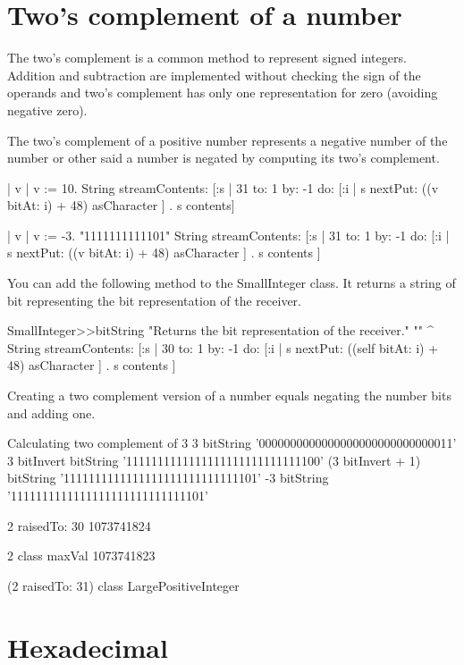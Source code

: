 \documentclass[a4paper,10pt,twoside]{book}
\begin{document}
\section{Two's complement of a number}
The two's complement is a common method to represent signed integers. Addition and subtraction are implemented without checking the sign of the operands and two's complement has only one representation for zero (avoiding negative zero).

The two's complement of a positive number represents a negative number of the number or other said a number is negated by computing its two's complement. 


\begin{code}{}
| v |
v := 10. 
String streamContents: [:s | 
	31 to: 1 by: -1 do: [:i | s nextPut: ((v bitAt: i) + 48) asCharacter   ] .
	s contents] 

| v |
v := -3.  "1111111111101"
String streamContents: [:s | 
	31 to: 1 by: -1 do: [:i | s nextPut: ((v bitAt: i) + 48) asCharacter   ] .
	s contents
	] 
\end{code}

You can add the following method  to the SmallInteger class. It returns a string of bit representing the bit representation of the receiver.

\begin{code}{}
SmallInteger>>bitString
	"Returns the bit representation of the receiver."
	""
	^ String streamContents: [:s | 
		30 to: 1 by: -1 do: [:i | s nextPut: ((self bitAt: i) + 48) asCharacter ] .
		s contents ]
\end{code}




Creating a two complement version of a number equals negating the number bits and adding one.
\begin{code}{Calculating two complement of 3}
3 bitString '0000000000000000000000000000011'
3 bitInvert bitString '1111111111111111111111111111100'
(3 bitInvert + 1) bitString '1111111111111111111111111111101'
-3 bitString '1111111111111111111111111111101'
\end{code}

2 raisedTo: 30 
	1073741824 

2 class maxVal 
	1073741823

(2 raisedTo: 31) class LargePositiveInteger

\section{Hexadecimal}
\end{document}
